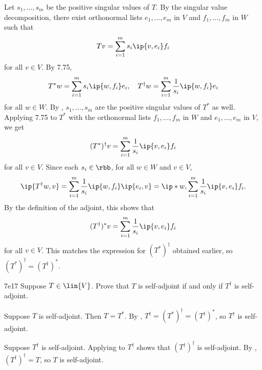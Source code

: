 \begin{sol}
    Let $s_1, \ldots, s_m$ be the positive singular values of $T$.
    By the singular value decomposition, there exist orthonormal lists $e_1, \ldots, e_m$ in $V$ and $f_1, \ldots, f_m$ in $W$ such that
    \[
        T v = \sum_{i=1}^m s_i \ip{v, e_i} f_i
    \]
    for all $v \in V$.
    By 7.75,
    \[
        T^\ast w = \sum_{i=1}^m s_i \ip{w, f_i} e_i, \quad T^\dagger w = \sum_{i=1}^m \frac{1}{s_i} \ip{w, f_i} e_i
    \]
    for all $w \in W$.
    By , $s_1, \ldots, s_m$ are the positive singular values of $T^\ast$ as well.
    Applying 7.75 to $T^\ast$ with the orthonormal lists $f_1, \ldots, f_m$ in $W$ and $e_1, \ldots, e_m$ in $V$, we get
    \[
        (T^\ast)^\dagger v = \sum_{i=1}^m \frac{1}{s_i} \ip{v, e_i} f_i
    \]
    for all $v \in V$.
    Since each $s_i \in \rbb$, for all $w \in W$ and $v \in V$,
    \[
        \ip{T^\dagger w, v} = \sum_{i=1}^m \frac{1}{s_i} \ip{w, f_i} \ip{e_i, v} = \ip*{w, \sum_{i=1}^m \frac{1}{s_i} \ip{v, e_i} f_i}.
    \]
    By the definition of the adjoint, this shows that
    \[
        (T^\dagger)^\ast v = \sum_{i=1}^m \frac{1}{s_i} \ip{v, e_i} f_i
    \]
    for all $v \in V$.
    This matches the expression for $(T^\ast)^\dagger$ obtained earlier, so $(T^\ast)^\dagger = (T^\dagger)^\ast$.
\end{sol}

\begin{exercise}{7e17}
    Suppose $T \in \lin{V}$.
    Prove that $T$ is self-adjoint if and only if $T^\dagger$ is self-adjoint.
\end{exercise}

\begin{soliff}
    \rightimp Suppose $T$ is self-adjoint.
    Then $T = T^\ast$.
    By , $T^\dagger = (T^\ast)^\dagger = (T^\dagger)^\ast$, so $T^\dagger$ is self-adjoint.

    \leftimp Suppose $T^\dagger$ is self-adjoint.
    Applying \rightimp to $T^\dagger$ shows that $(T^\dagger)^\dagger$ is self-adjoint.
    By , $(T^\dagger)^\dagger = T$, so $T$ is self-adjoint.
\end{soliff}
